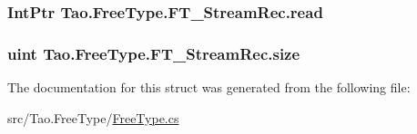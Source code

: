 \hypertarget{struct_tao_1_1_free_type_1_1_f_t___stream_rec_aeafd0be72e4838c3ce09daa79821cdae}{
\subsubsection[{read}]{\setlength{\rightskip}{0pt plus 5cm}IntPtr {\bf Tao.FreeType.FT\_\-StreamRec.read}}}
\label{struct_tao_1_1_free_type_1_1_f_t___stream_rec_aeafd0be72e4838c3ce09daa79821cdae}
\hypertarget{struct_tao_1_1_free_type_1_1_f_t___stream_rec_a0cb212bb23ff4617114648719787b455}{
\subsubsection[{size}]{\setlength{\rightskip}{0pt plus 5cm}uint {\bf Tao.FreeType.FT\_\-StreamRec.size}}}
\label{struct_tao_1_1_free_type_1_1_f_t___stream_rec_a0cb212bb23ff4617114648719787b455}


The documentation for this struct was generated from the following file:\begin{DoxyCompactItemize}
\item 
src/Tao.FreeType/\hyperlink{_free_type_8cs}{FreeType.cs}\end{DoxyCompactItemize}
